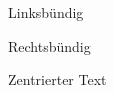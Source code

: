 \documentclass[a4paper, 12pt]{article}
\begin{document}
\begin{flushleft}
    Linksb\"undig
\end{flushleft}

\begin{flushright}
    \vspace{-2em}
    Rechtsb\"undig
    \vspace{10em}
\end{flushright}

\begin{center}
    Zentrierter Text
\end{center}
\end{document}
